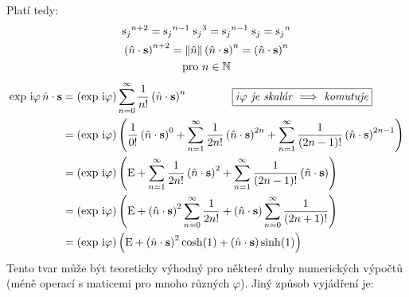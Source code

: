\documentclass[10pt,a4paper]{article}
\newcommand{\const}[1]{\text{\rmfamily\upshape #1}}
\newcommand{\norm}[1]{\left\lVert#1\right\rVert}
\renewcommand{\i}{\const{i}}
\begin{document}
Platí tedy:
\begin{gather*}
    {\const{s}_j}^{n+2} =
    {\const{s}_j}^{n-1} \;
    {\const{s}_j}^3 =
    {\const{s}_j}^{n-1} \;
    {\const{s}_j} =
    {\const{s}_j}^n
    \\
    \left(\hat{n} \cdot \mathbf{s}\right)^{n+2} =
    \norm{\hat{n}} \left(\hat{n} \cdot \mathbf{s}\right)^n =
    \left(\hat{n} \cdot \mathbf{s}\right)^n
    \\
    \text{pro } n \in \mathbb{N}
    \\
\end{gather*}
\begin{align*}
    \exp \, \i \varphi \,
    \hat{n} \cdot \mathbf{s}
    &=
    \left(\exp \, \i \varphi\right)
    \sum_{n=0}^\infty
    \frac{1}{n!}
    \left(\hat{n} \cdot \mathbf{s}\right)^n
    \hspace{4em}
    \boxed{\textit{$i\varphi$ je skalár $\implies$ komutuje}}
    \\
    &=
    \left(\exp \, \i \varphi\right)
    \left(
        \frac{1}{0!}
        \left(\hat{n} \cdot \mathbf{s}\right)^0
        +
        \sum_{n=1}^\infty
        \frac{1}{2n!}
        \left(\hat{n} \cdot \mathbf{s}\right)^{2n}
        +
        \sum_{n=1}^\infty
        \frac{1}{(2n-1)!}
        \left(\hat{n} \cdot \mathbf{s}\right)^{2n-1}
    \right)
    \\
    &=
    \left(\exp \, \i \varphi\right)
    \left(
        \const{E}
        +
        \sum_{n=1}^\infty
        \frac{1}{2n!}
        \left(\hat{n} \cdot \mathbf{s}\right)^2
        +
        \sum_{n=1}^\infty
        \frac{1}{(2n-1)!}
        \left(\hat{n} \cdot \mathbf{s}\right)
    \right)
    \\
    &=
    \left(\exp \, \i \varphi\right)
    \left(
        \const{E}
        +
        \left(\hat{n} \cdot \mathbf{s}\right)^2
        \sum_{n=0}^\infty
        \frac{1}{2n!}
        +
        \left(\hat{n} \cdot \mathbf{s}\right)
        \sum_{n=0}^\infty
        \frac{1}{(2n+1)!}
    \right)
    \\
    &=
    \left(\exp \, \i \varphi\right)
    \left(
        \const{E}
        +
        \left(\hat{n} \cdot \mathbf{s}\right)^2
        \cosh(1)
        +
        \left(\hat{n} \cdot \mathbf{s}\right)
        \sinh(1)
    \right)
\end{align*}
Tento tvar může být teoreticky výhodný pro některé druhy numerických výpočtů (méně operací s maticemi pro mnoho různých $\varphi$). Jiný způsob vyjádření je:
\end{document}
